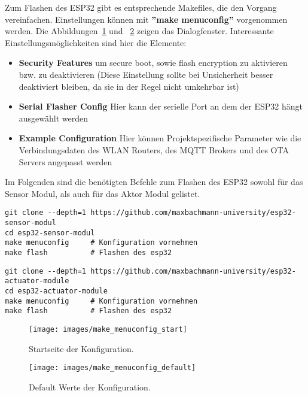 Zum Flashen des ESP32 gibt es entsprechende Makefiles, die den Vorgang vereinfachen. Einstellungen können mit \textbf{''make menuconfig''} vorgenommen werden. Die Abbildungen~\ref{fig:config_start} und ~\ref{fig:config_default} zeigen das Dialogfenster.
Interessante Einstellungsmöglichkeiten sind hier die Elemente:
\begin{itemize}
	\item \textbf{Security Features} um secure boot, sowie flash encryption zu aktivieren bzw. zu deaktivieren (Diese Einstellung sollte bei Unsicherheit besser deaktiviert bleiben, da sie in der Regel nicht umkehrbar ist)
	\item \textbf{Serial Flasher Config} Hier kann der serielle Port an dem der ESP32 hängt ausgewählt werden
	\item \textbf{Example Configuration} Hier können Projektspezifische Parameter wie die Verbindungsdaten des WLAN Routers, des MQTT Brokers und des OTA Servers angepasst werden
\end{itemize}

Im Folgenden sind die benötigten Befehle zum Flashen des ESP32 sowohl für das Sensor Modul, als auch für das Aktor Modul gelistet.
\begin{lstlisting}
git clone --depth=1 https://github.com/maxbachmann-university/esp32-sensor-modul
cd esp32-sensor-modul
make menuconfig		# Konfiguration vornehmen
make flash			# Flashen des esp32
\end{lstlisting}

\begin{lstlisting}
git clone --depth=1 https://github.com/maxbachmann-university/esp32-actuator-module
cd esp32-actuator-module
make menuconfig		# Konfiguration vornehmen
make flash			# Flashen des esp32
\end{lstlisting}

\begin{figure}[hbt]
	\centering
	\texttt{[image: images/make\_menuconfig\_start]}
	\caption[Konfiguration Startseite]{Startseite der Konfiguration.}
	\label{fig:config_start}
\end{figure}

\begin{figure}[hbt]
	\centering
	\texttt{[image: images/make\_menuconfig\_default]}
	\caption[Konfiguration Standard]{Default Werte der Konfiguration.}
	\label{fig:config_default}
\end{figure}

